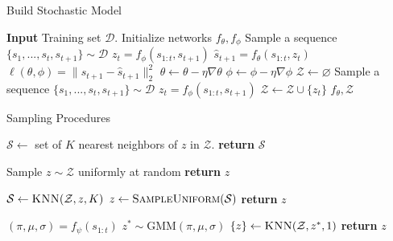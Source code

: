 \documentclass{article}
\begin{document}
\begin{minipage}[t]{7cm}
  \vspace{0pt}

  \begin{algorithm}[H]
    \caption{Build Stochastic Model}
  \begin{algorithmic}[1]
    \State \textbf{Input} Training set $\mathcal{D}$.
    \State Initialize networks $f_\theta, f_\phi$
    \State Sample a sequence $\{s_1, ..., s_t, s_{t+1}\} \sim \mathcal{D}$
    \State $z_t = f_{\phi}(s_{1:t}, s_{t+1})$
    \State $\hat{s}_{t+1} = f_{\theta}(s_{1:t}, z_t)$
    \State $\ell(\theta, \phi) = \|s_{t+1} - \hat{s}_{t+1} \|_2^2$
    \State $\theta \leftarrow \theta - \eta \nabla \theta$
    \State $\phi \leftarrow \phi - \eta \nabla \phi$
    \EndWhile
    \State $\mathcal{Z} \leftarrow \varnothing$
    \State Sample a sequence $\{s_1, ..., s_t, s_{t+1}\} \sim \mathcal{D}$
    \State $z_t = f_{\phi}(s_{1:t}, s_{t+1})$
    \State $\mathcal{Z} \leftarrow \mathcal{Z} \cup \{ z_t \}$
    \EndFor
    \Return $f_\theta, \mathcal{Z}$
    \State
  \end{algorithmic}
  \end{algorithm}
\end{minipage}%
\begin{minipage}[t]{7cm}
  \vspace{0pt}

\begin{algorithm}[H]
  \caption{Sampling Procedures}\label{algo-sample}
  \begin{algorithmic}[1]
    \State $\mathcal{S} \gets $ set of $K$ nearest neighbors of $z$ in $\mathcal{Z}$.
    \State \textbf{return} $\mathcal{S}$
    \EndProcedure

    \State Sample $z \sim \mathcal{Z}$ uniformly at random
    \State \textbf{return} $z$
    \EndProcedure

    \State $\mathcal{S} \gets \textsc{KNN}(\mathcal{Z}, z, K)$
    \State $z \gets \textsc{SampleUniform}(\mathcal{S})$
    \State \textbf{return} $z$
    \EndProcedure

    \State $(\pi, \mu, \sigma) = f_\psi(s_{1:t})$
    \State $z^* \sim \mbox{GMM}(\pi, \mu, \sigma)$
    \State $\{z\} \gets \textsc{KNN}(\mathcal{Z}, z^*, 1)$
    \State \textbf{return} $z$
    \EndProcedure
    \State
  \end{algorithmic}
\end{algorithm}
\end{minipage}
\end{document}
